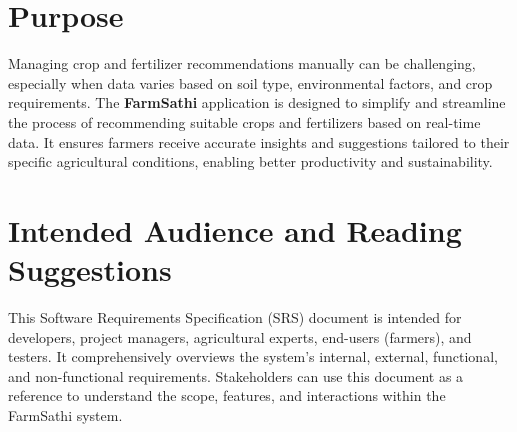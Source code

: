 \documentclass{scrreprt}
\begin{document}
\section{Purpose}
Managing crop and fertilizer recommendations manually can be challenging, especially when data varies based on soil type, environmental factors, and crop requirements. The \textbf{FarmSathi} application is designed to simplify and streamline the process of recommending suitable crops and fertilizers based on real-time data. It ensures farmers receive accurate insights and suggestions tailored to their specific agricultural conditions, enabling better productivity and sustainability. 

\section{Intended Audience and Reading Suggestions}
This Software Requirements Specification (SRS) document is intended for developers, project managers, agricultural experts, end-users (farmers), and testers. It comprehensively overviews the system's internal, external, functional, and non-functional requirements. Stakeholders can use this document as a reference to understand the scope, features, and interactions within the FarmSathi system.
\end{document}
